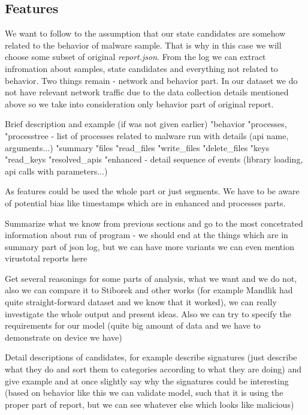 \subsection{Features}
We want to follow to the assumption that our state candidates are somehow related to the behavior of malware sample. That is why in this case we will choose some subset of original \emph{report.json}.
From the log we can extract infromation about samples, state candidates and everything not related to behavior. Two things remain - network and behavior part. In our dataset we do not have relevant network traffic due to the data collection details mentioned above so we take into consideration only behavior part of original report.

Brief description and example (if was not given earlier)
"behavior
    "processes, "processtree  - list of processes related to malware run with details (api name, arguments...)
    "summary
        "files
        "read_files
        "write_files
        "delete_files
        "keys
        "read_keys
        "resolved_apis    
    "enhanced - detail sequence of events (library loading, api calls with parameters...)

As features could be used the whole part or just segments. We have to be aware of potential bias like timestamps which are in enhanced and processes parts.



Summarize what we know from previous sections and go to the most concetrated information about run of program - we should end at the things which are in summary part of json log, but we can have more variants
we can even mention virustotal reports here

Get several reasonings for some parts of analysis, what we want and we do not, also we can compare it to Stiborek and other works (for example Mandlik had quite straight-forward dataset and we know that it worked), we can really investigate the whole output and present ideas. Also we can try to specify the requirements for our model (quite big amount of data and we have to demonstrate on device we have)


Detail descriptions of candidates, for example describe signatures (just describe what they do and sort them to categories according to what they are doing) and give example and at once slightly say why the signatures could be interesting (based on behavior like this we can validate model, such that it is using the proper part of report, but we can see whatever else which looks like malicious)

